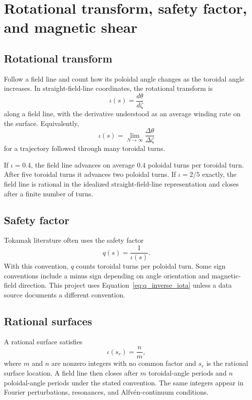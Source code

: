\section{Rotational transform, safety factor, and magnetic shear}
\label{sec:iota}

\subsection{Rotational transform}
Follow a field line and count how its poloidal angle changes as the toroidal angle increases. In straight-field-line coordinates, the rotational transform is
\begin{equation}
\iota(s)=\frac{d\theta}{d\zeta}
\label{eq:iota_dtheta_dzeta}
\end{equation}
along a field line, with the derivative understood as an average winding rate on the surface. Equivalently,
\begin{equation}
\iota(s)=\lim_{N\rightarrow\infty}\frac{\Delta\theta}{\Delta\zeta}
\end{equation}
for a trajectory followed through many toroidal turns.

If $\iota=0.4$, the field line advances on average $0.4$ poloidal turns per toroidal turn. After five toroidal turns it advances two poloidal turns. If $\iota=2/5$ exactly, the field line is rational in the idealized straight-field-line representation and closes after a finite number of turns.

\subsection{Safety factor}
Tokamak literature often uses the safety factor
\begin{equation}
q(s)=\frac{1}{\iota(s)}.
\label{eq:q_inverse_iota}
\end{equation}
With this convention, $q$ counts toroidal turns per poloidal turn. Some sign conventions include a minus sign depending on angle orientation and magnetic-field direction. This project uses Equation~\eqref{eq:q_inverse_iota} unless a data source documents a different convention.

\subsection{Rational surfaces}
A rational surface satisfies
\begin{equation}
\iota(s_r)=\frac{n}{m},
\label{eq:rational_iota}
\end{equation}
where $m$ and $n$ are nonzero integers with no common factor and $s_r$ is the rational surface location. A field line then closes after $m$ toroidal-angle periods and $n$ poloidal-angle periods under the stated convention. The same integers appear in Fourier perturbations, resonances, and Alfv\'en-continuum conditions.

